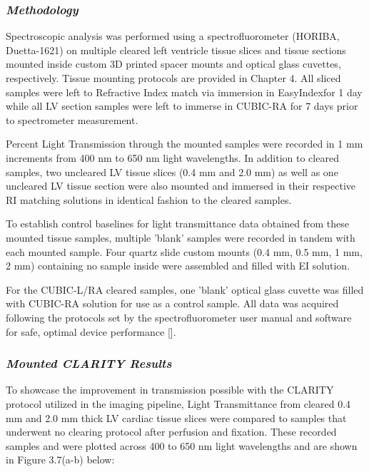 \subsubsection{\textit{Methodology}}

Spectroscopic analysis was performed using a spectrofluorometer (HORIBA, Duetta-1621) on multiple cleared left ventricle tissue slices and tissue sections mounted inside custom 3D printed spacer mounts and optical glass cuvettes, respectively. Tissue mounting protocols are provided in Chapter 4. All sliced samples were left to Refractive Index match via immersion in EasyIndex\textrademark for 1 day while all LV section samples were left to immerse in CUBIC-RA for 7 days prior to spectrometer measurement. 

Percent Light Transmission through the mounted samples were recorded in 1 mm increments from 400 nm to 650 nm light wavelengths.  In addition to cleared samples, two uncleared LV tissue slices (0.4 mm and 2.0 mm) as well as one uncleared LV tissue section were also mounted and immersed in their respective RI matching solutions in identical fashion to the cleared samples. 

To establish control baselines for light transmittance data obtained from these mounted tissue samples, multiple 'blank' samples were recorded in tandem with each mounted sample. Four quartz slide custom mounts (0.4 mm, 0.5 mm, 1 mm, 2 mm) containing no sample inside were assembled and filled with EI solution. 

For the CUBIC-L/RA cleared samples, one 'blank' optical glass cuvette was filled with CUBIC-RA solution for use as a control sample. All data was acquired following the protocols set by the spectrofluorometer user manual and software for safe, optimal device performance [].

\subsubsection{\textit{Mounted CLARITY Results}}

To showcase the improvement in transmission possible with the CLARITY protocol utilized in the imaging pipeline, Light Transmittance from cleared 0.4 mm and 2.0 mm thick LV cardiac tissue slices were compared to samples that underwent no clearing protocol after perfusion and fixation. These recorded samples and were plotted across 400 to 650 nm light wavelengths and are shown in Figure 3.7(a-b) below:

